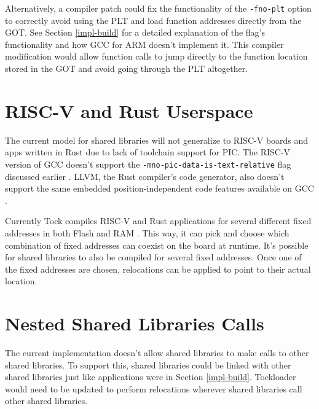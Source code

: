\documentclass[12pt]{ucsddissertation}
\begin{document}
Alternatively, a compiler patch could fix the functionality of the \texttt{-fno-plt} option to correctly avoid using the PLT and load function addresses directly from the GOT.  See Section \ref{impl-build} for a detailed explanation of the flag's functionality and how GCC for ARM doesn't implement it. This compiler modification would allow function calls to jump directly to the function location stored in the GOT and avoid going through the PLT altogether.

\section{RISC-V and Rust Userspace}

The current model for shared libraries will not generalize to RISC-V boards and apps written in Rust due to lack of toolchain support for PIC. The RISC-V version of GCC doesn't support the \texttt{-mno-pic-data-is-text-relative} flag discussed earlier \cite{riscv-gcc, more-riscv-gcc}. LLVM, the Rust compiler's code generator, also doesn't support the same embedded position-independent code features available on GCC \cite{llvm-mail, llvm-forum, amit-forum}.

Currently Tock compiles RISC-V and Rust applications for several different fixed addresses in both Flash and RAM \cite{tock-compilation}. This way, it can pick and choose which combination of fixed addresses can coexist on the board at runtime. It's possible for shared libraries to also be compiled for several fixed addresses. Once one of the fixed addresses are chosen, relocations can be applied to point to their actual location.

\section{Nested Shared Libraries Calls}

The current implementation doesn't allow shared libraries to make calls to other shared libraries. To support this, shared libraries could be linked with other shared libraries just like applications were in Section \ref{impl-build}. Tockloader would need to be updated to perform relocations wherever shared libraries call other shared libraries.

\end{document}
